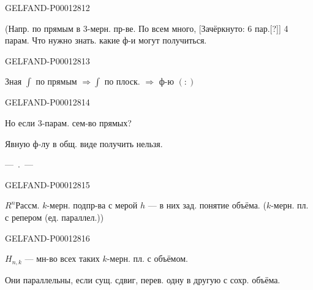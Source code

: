 \begin{GelfandAdjacentEvidence}{GELFAND-P000128}{12}

(Напр. по прямым в 3-мерн. пр-ве. По всем много,
[Зачёркнуто: 6 пар.[?]]
4 парам. Что нужно знать. какие ф-и могут получиться.
\end{GelfandAdjacentEvidence}
\begin{GelfandAdjacentEvidence}{GELFAND-P000128}{13}

Зная $\int$ по прямым $\Rightarrow\int$ по плоск. $\Rightarrow$ ф-ю $(:)$
\end{GelfandAdjacentEvidence}
\begin{GelfandAdjacentEvidence}{GELFAND-P000128}{14}

Но если 3-парам. сем-во прямых?

Явную ф-лу в общ. виде получить нельзя.

\begin{center}---\, .\, ---\end{center}
\end{GelfandAdjacentEvidence}
\begin{GelfandAdjacentEvidence}{GELFAND-P000128}{15}

$R^n$\quad Рассм. $k$-мерн. подпр-ва с мерой $h$ --- в них зад. понятие объёма. ($k$-мерн. пл. с репером (ед. параллел.))
\end{GelfandAdjacentEvidence}
\begin{GelfandAdjacentEvidence}{GELFAND-P000128}{16}

$H_{n,k}$ --- мн-во всех таких $k$-мерн. пл. с объёмом.

Они параллельны, если сущ. сдвиг, перев. одну в другую с сохр. объёма.
\end{GelfandAdjacentEvidence}




